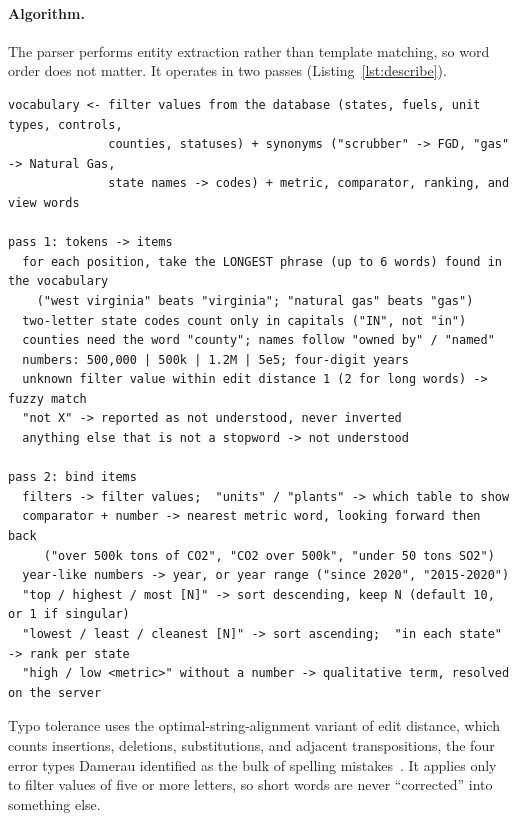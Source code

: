\documentclass[11pt,a4paper]{article}
\begin{document}
\paragraph{Algorithm.} The parser performs entity extraction rather than template matching, so
word order does not matter. It operates in two passes (Listing~\ref{lst:describe}).

\begin{lstlisting}[language={}, caption={Outline of the description parser.}, label=lst:describe, numbers=none]
vocabulary <- filter values from the database (states, fuels, unit types, controls,
              counties, statuses) + synonyms ("scrubber" -> FGD, "gas" -> Natural Gas,
              state names -> codes) + metric, comparator, ranking, and view words

pass 1: tokens -> items
  for each position, take the LONGEST phrase (up to 6 words) found in the vocabulary
    ("west virginia" beats "virginia"; "natural gas" beats "gas")
  two-letter state codes count only in capitals ("IN", not "in")
  counties need the word "county"; names follow "owned by" / "named"
  numbers: 500,000 | 500k | 1.2M | 5e5; four-digit years
  unknown filter value within edit distance 1 (2 for long words) -> fuzzy match
  "not X" -> reported as not understood, never inverted
  anything else that is not a stopword -> not understood

pass 2: bind items
  filters -> filter values;  "units" / "plants" -> which table to show
  comparator + number -> nearest metric word, looking forward then back
     ("over 500k tons of CO2", "CO2 over 500k", "under 50 tons SO2")
  year-like numbers -> year, or year range ("since 2020", "2015-2020")
  "top / highest / most [N]" -> sort descending, keep N (default 10, or 1 if singular)
  "lowest / least / cleanest [N]" -> sort ascending;  "in each state" -> rank per state
  "high / low <metric>" without a number -> qualitative term, resolved on the server
\end{lstlisting}

Typo tolerance uses the optimal-string-alignment variant of edit distance, which counts
insertions, deletions, substitutions, and adjacent transpositions, the four error types
Damerau identified as the bulk of spelling mistakes~\cite{damerau1964}. It applies only to
filter values of five or more letters, so short words are never ``corrected'' into something
else.
\end{document}
